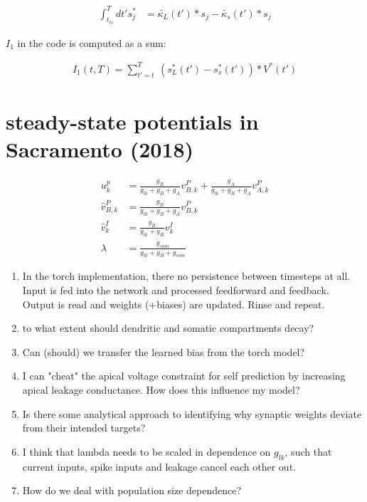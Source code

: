\documentclass[12pt,a4paper,titlepage]{report}
\begin{document}
\begin{align*}
  \int_{t_{ls}}^T dt' s_j^* & =  \tilde{\kappa_L}(t') * s_j -  \tilde{\kappa_s}(t') * s_j
\end{align*}

$I_1$ in the code is computed as a sum:

\begin{align}
  I_1 (t,T) = \sum_{t'=t}^T \ (s_L^*(t') - s_s^*(t')) * V^*(t')
\end{align}


\section{steady-state potentials in Sacramento (2018)}

\begin{align*}
  u_k^p           & = \frac{g_B}{g_{lk} + g_B + g_A} v^P_{B,k} + \frac{g_A}{g_{lk} + g_B + g_A} v^P_{A,k} \\
  \hat{v}^P_{B,k} & = \frac{g_B}{g_{lk} + g_B + g_A} v^P_{B,k}                                            \\
  \hat{v}^I_{k}   & = \frac{g_B}{g_{lk} + g_B} v^I_{k}                                                    \\
  \lambda         & = \frac{g_{som}}{g_{lk} + g_B + g_{som}}
\end{align*}



\begin{enumerate}
  \item In the torch implementation, there no persistence between timesteps at all. Input is fed into the network and processed feedforward and feedback. Output is read and weights (+biases) are updated. Rinse and repeat.
  \item to what extent should dendritic and somatic compartments decay?
  \item Can (should) we transfer the learned bias from the torch model?
  \item I can "cheat" the apical voltage constraint for self prediction by increasing apical leakage conductance. How does this influence my model?
  \item Is there some analytical approach to identifying why synaptic weights deviate from their intended targets?
  \item I think that lambda needs to be scaled in dependence on $g_{lk}$, such that current inputs, spike inputs and leakage cancel each other out.

  \item How do we deal with population size dependence?

\end{enumerate}
\end{document}
